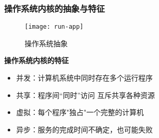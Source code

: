 \begin{frame}[plain]
    \frametitle{操作系统内核的抽象与特征}
    \begin{figure}
        \centering
        \texttt{[image: run-app]}
        \caption{操作系统抽象}
    \end{figure} %
    \textbf{操作系统内核的特征}
    \begin{itemize}
        \item 并发：计算机系统中同时存在多个运行程序 %
        \item 共享：程序间“同时”访问 互斥共享各种资源 %
        \item 虚拟：每个程序"独占"一个完整的计算机 %
        \item 异步：服务的完成时间不确定，也可能失败
    \end{itemize}
    
\end{frame}


